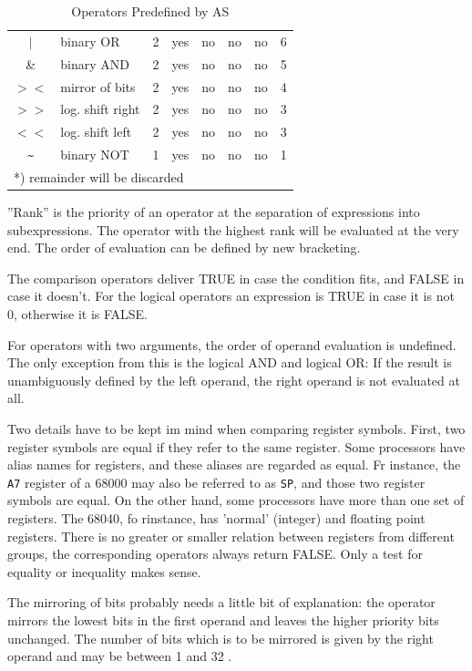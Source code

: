 \documentclass[12pt,twoside]{report}
\newcommand{\asname}{{AS}}
\begin{document}
\begin{table}[htbp]
\begin{center}
\begin{tabular}{|c|l|c|c|c|c|c|c|}
$|$         & binary OR        & 2 & yes   & no  & no  & no  & 6 \\
\&          & binary AND       & 2 & yes   & no  & no  & no  & 5 \\
$><$        & mirror of bits   & 2 & yes   & no  & no  & no  & 4 \\
$>>$        & log. shift right & 2 & yes   & no  & no  & no  & 3 \\
$<<$        & log. shift left  & 2 & yes   & no  & no  & no  & 3 \\
\verb! ~ !  & binary NOT       & 1 & yes   & no  & no  & no  & 1 \\
\hline
\multicolumn{8}{|l|}{*) remainder will be discarded} \\
\hline
\end{tabular}\end{center}
\caption{Operators Predefined by \asname{}\label{TabOps}}
\end{table}
''Rank'' is the priority of an operator at the separation of expressions
into subexpressions.  The operator with the highest rank will be
evaluated at the very end.  The order of evaluation can be defined by
new bracketing.

The comparison operators deliver TRUE in case the condition fits,
and FALSE in case it doesn't.  For the logical operators an expression
is TRUE in case it is not 0, otherwise it is FALSE.

For operators with two arguments, the order of operand evaluation
is undefined.  The only exception from this is the logical AND and
logical OR: If the result is unambiguously defined by the left
operand, the right operand is not evaluated at all.

Two details have to be kept im mind when comparing register symbols.
First, two register symbols are equal if they refer to the same 
register.  Some processors have alias names for registers, and these
aliases are regarded as equal.  Fr instance, the {\tt A7} register
of a 68000 may also be referred to as {\tt SP}, and those two register
symbols are equal.  On the other hand, some processors have more than
one set of registers.  The 68040, fo rinstance, has 'normal' (integer)
and floating point registers.  There is no greater or smaller relation
between registers from different groups, the corresponding operators
always return FALSE.  Only a test for equality or inequality makes
sense.

The mirroring of bits probably needs a little bit of explanation: the
operator mirrors the lowest bits in the first operand and leaves the
higher priority bits unchanged.  The number of bits which is to be
mirrored is given by the right operand and may be between 1 and 32 .
\end{document}
